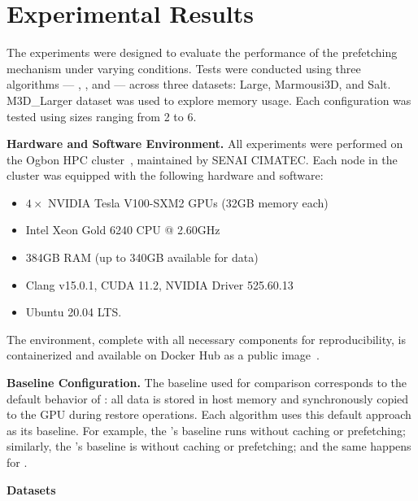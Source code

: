 \documentclass[Ingles,Final]{ic-tese-v3}
\begin{document}
\section{Experimental Results}
\label{sec:prefetch_result}

The experiments were designed to evaluate the performance of the prefetching mechanism under varying conditions. Tests were conducted using three \checkpointing algorithms — \revolve, \zcut, and \uniform — across three datasets: Large, Marmousi3D, and Salt. M3D\_Larger dataset was used to explore memory usage. Each configuration was tested using \cache sizes ranging from 2 to 6.

\vspace{1em}
\noindent
\textbf{Hardware and Software Environment.}
All experiments were performed on the Ogbon HPC cluster~\cite{ogbon}, maintained by SENAI CIMATEC. Each node in the cluster was equipped with the following hardware and software:

\begin{itemize}
    \item $4 \times$ NVIDIA Tesla V100-SXM2 GPUs (32GB memory each)
    \item Intel Xeon Gold 6240 CPU @ 2.60GHz
    \item 384GB RAM (up to 340GB available for \checkpointing data)
    \item Clang v15.0.1, CUDA 11.2, NVIDIA Driver 525.60.13
    \item Ubuntu 20.04 LTS.
\end{itemize}

The environment, complete with all necessary components for reproducibility, is containerized and available on Docker Hub as a public image~\cite{dockerhub}.

\vspace{1em}
\noindent
\textbf{Baseline Configuration.}
The baseline used for comparison corresponds to the default behavior of \awave: all \checkpointing data is stored in host memory and synchronously copied to the GPU during restore operations. Each \checkpointing algorithm uses this default approach as its baseline. For example, the \revolve's baseline runs \revolve without caching or prefetching; similarly, the \zcut's baseline is \zcut without caching or prefetching; and the same happens for \uniform.

\vspace{1em}
\noindent
\textbf{Datasets}
\end{document}
